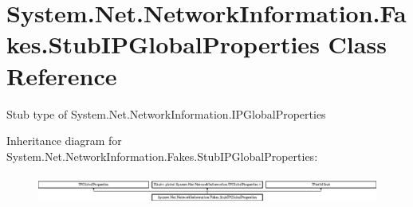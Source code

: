 \hypertarget{class_system_1_1_net_1_1_network_information_1_1_fakes_1_1_stub_i_p_global_properties}{\section{System.\-Net.\-Network\-Information.\-Fakes.\-Stub\-I\-P\-Global\-Properties Class Reference}
\label{class_system_1_1_net_1_1_network_information_1_1_fakes_1_1_stub_i_p_global_properties}
}


Stub type of System.\-Net.\-Network\-Information.\-I\-P\-Global\-Properties 


Inheritance diagram for System.\-Net.\-Network\-Information.\-Fakes.\-Stub\-I\-P\-Global\-Properties\-:\begin{figure}[H]
\begin{center}
\leavevmode
\includegraphics[height=0.947547cm]{class_system_1_1_net_1_1_network_information_1_1_fakes_1_1_stub_i_p_global_properties}
\end{center}
\end{figure}
